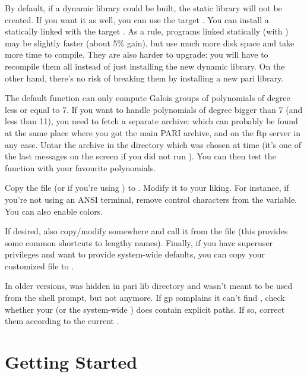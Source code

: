 By default, if a dynamic library  could be built, the static
library  will not be created. If you want it as well, you can
use the target . You can install a statically
linked  with the target . As a rule,
programs linked statically (with ) may be slightly faster
(about 5\% gain), but use much more disk space and take more time to compile.
They are also harder to upgrade: you will have to recompile them all instead
of just installing the new dynamic library. On the other hand, there's no
risk of breaking them by installing a new pari library.

 The default  function can only
compute Galois groups of polynomials of degree less or equal to 7. If you
want to handle polynomials of degree bigger than 7 (and less than 11), you
need to fetch a separate archive:  which can probably be
found at the same place where you got the main PARI archive, and on the
 ftp server in any case. Untar the archive in the 
directory which was chosen at  time (it's one of the last
messages on the screen if you did not run ). You can then
test the  function with your favourite polynomials.

 Copy the file  (or
 if you're using ) to . Modify
it to your liking. For instance, if you're not using an ANSI terminal,
remove control characters from the  variable. You can also
enable colors. 

If desired, also copy/modify  somewhere and call it from
the  file (this provides some common shortcuts to lengthy names).
Finally, if you have superuser privileges and want to provide system-wide
defaults, you can copy your customized  file to .

In older versions,  was hidden in pari lib directory and wasn't
meant to be used from the shell prompt, but not anymore. If gp complains it
can't find , check whether your  (or the system-wide
) does contain explicit paths. If so, correct them according to the
current .

\section{Getting Started}

